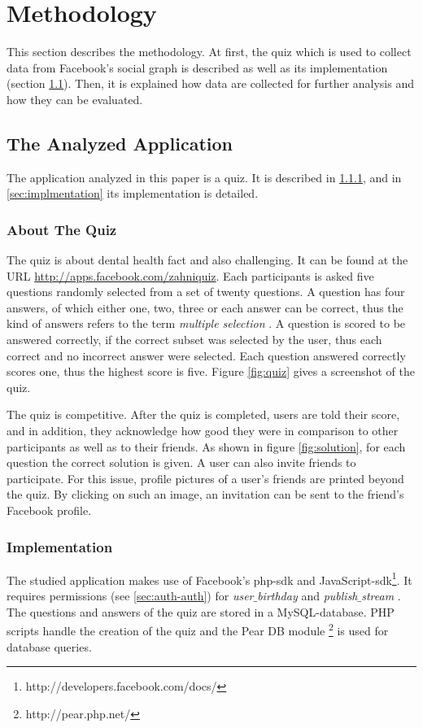 \documentclass[preprint,12pt]{elsarticle}
\begin{document}
\section{Methodology}
\label{sec:method}
This section describes the methodology. At first, the quiz which is
used to collect data from Facebook's social graph is described as well
as its implementation (section \ref{sec:quiz}).
Then, it is explained how data are collected for
further analysis and how they can be evaluated.

\subsection{The Analyzed Application}
\label{sec:quiz}
The application analyzed in this paper is a quiz. It is described in
\ref{sec:aboutQuiz}, and in \ref{sec:implmentation} its implementation
is detailed.

\subsubsection{About The Quiz}
\label{sec:aboutQuiz}
The quiz is about dental health fact and also challenging. It can be
found at the URL \url{http://apps.facebook.com/zahniquiz}.
Each participants is asked five questions randomly selected
from a set of twenty questions. A question has four answers, of
which either one, two, three or each answer can be correct, thus
the kind of answers refers to the term \textit{multiple selection} .
A question is scored to be answered correctly, if the correct subset
was selected by the user, thus  each correct and no incorrect answer
were selected. Each question answered correctly scores one, thus the
highest score is five. Figure \ref{fig:quiz} gives a screenshot of the quiz. 

The quiz is competitive. After the quiz is completed, users are told
their score, and in addition, they acknowledge how good they were in
comparison to other participants as well as to their 
friends. As shown in figure \ref{fig:solution}, for each question the
correct solution is given. A user can also invite friends to
participate. For this issue, profile pictures of a user's friends are
printed beyond the quiz. By clicking on such an image, an invitation
can be sent to the friend's Facebook profile. 


\subsubsection{Implementation}
\label{sec:implementation}
The studied application makes use of 
Facebook's php-\ac{sdk} and JavaScript-\ac{sdk}\footnote{http://developers.facebook.com/docs/}. It requires
permissions (see \ref{sec:auth-auth}) for \textit{user$\_$birthday} and
\textit{publish$\_$stream} .
The questions and answers of the quiz are stored in a MySQL-database. PHP scripts
handle the creation of the quiz and
the Pear DB module \footnote{http://pear.php.net/} is used
for database queries.
\end{document}
